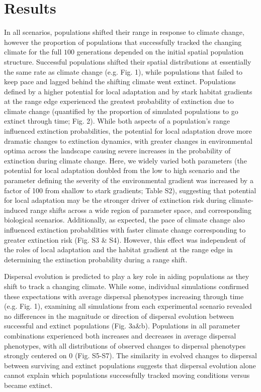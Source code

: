 \documentclass[12pt, oneside]{article}
\begin{document}
\section*{Results}
In all scenarios, populations shifted their range in response to climate change, however the proportion of populations that successfully tracked the changing climate for the full $100$ generations depended on the initial spatial population structure. Successful populations shifted their spatial distributions at essentially the same rate as climate change (e.g. Fig. 1), while populations that failed to keep pace and lagged behind the shifting climate went extinct. Populations defined by a higher potential for local adaptation and by stark habitat gradients at the range edge experienced the greatest probability of extinction due to climate change (quantified by the proportion of simulated populations to go extinct through time; Fig. 2). While both aspects of a population's range influenced extinction probabilities, the potential for local adaptation drove more dramatic changes to extinction dynamics, with greater changes in environmental optima across the landscape causing severe increases in the probability of extinction during climate change. Here, we widely varied both parameters (the potential for local adaptation doubled from the low to high scenario and the parameter defining the severity of the environmental gradient was increased by a factor of 100 from shallow to stark gradients; Table S2), suggesting that potential for local adaptation may be the stronger driver of extinction risk during climate-induced range shifts across a wide region of parameter space, and corresponding biological scenarios. Additionally, as expected, the pace of climate change also influenced extinction probabilities with faster climate change corresponding to greater extinction risk (Fig. S3 \& S4). However, this effect was independent of the roles of local adaptation and the habitat gradient at the range edge in determining the extinction probability during a range shift.

Dispersal evolution is predicted to play a key role in aiding populations as they shift to track a changing climate. While some, individual simulations confirmed these expectations with average dispersal phenotypes increasing through time (e.g. Fig. 1), examining all simulations from each experimental scenario revealed no differences in the magnitude or direction of dispersal evolution between successful and extinct populations (Fig. 3a\&b). Populations in all parameter combinations experienced both increases and decreases in average dispersal phenotypes, with all distributions of observed changes to dispersal phenotypes strongly centered on $0$ (Fig. S5-S7). The similarity in evolved changes to dispersal between surviving and extinct populations suggests that dispersal evolution alone cannot explain which populations successfully tracked moving conditions versus became extinct.
\end{document}
